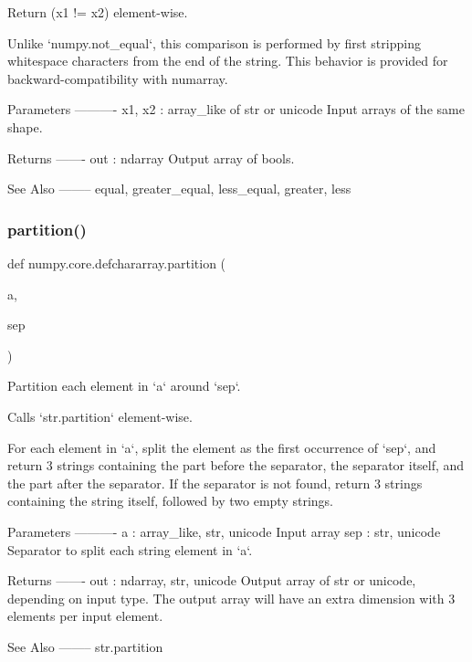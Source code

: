 \begin{DoxyVerb}Return (x1 != x2) element-wise.

Unlike `numpy.not_equal`, this comparison is performed by first
stripping whitespace characters from the end of the string.  This
behavior is provided for backward-compatibility with numarray.

Parameters
----------
x1, x2 : array_like of str or unicode
    Input arrays of the same shape.

Returns
-------
out : ndarray
    Output array of bools.

See Also
--------
equal, greater_equal, less_equal, greater, less
\end{DoxyVerb}
 \mbox{\label{namespacenumpy_1_1core_1_1defchararray_a44b124c89363204fc7c204026a190c89}} 
\subsubsection{\texorpdfstring{partition()}{partition()}}
{\footnotesize\ttfamily def numpy.\+core.\+defchararray.\+partition (\begin{DoxyParamCaption}\item[{}]{a,  }\item[{}]{sep }\end{DoxyParamCaption})}

\begin{DoxyVerb}Partition each element in `a` around `sep`.

Calls `str.partition` element-wise.

For each element in `a`, split the element as the first
occurrence of `sep`, and return 3 strings containing the part
before the separator, the separator itself, and the part after
the separator. If the separator is not found, return 3 strings
containing the string itself, followed by two empty strings.

Parameters
----------
a : array_like, {str, unicode}
    Input array
sep : {str, unicode}
    Separator to split each string element in `a`.

Returns
-------
out : ndarray, {str, unicode}
    Output array of str or unicode, depending on input type.
    The output array will have an extra dimension with 3
    elements per input element.

See Also
--------
str.partition\end{DoxyVerb}
 \mbox{\label{namespacenumpy_1_1core_1_1defchararray_a89de39e6aad0349370400196b3f8d143}} 
